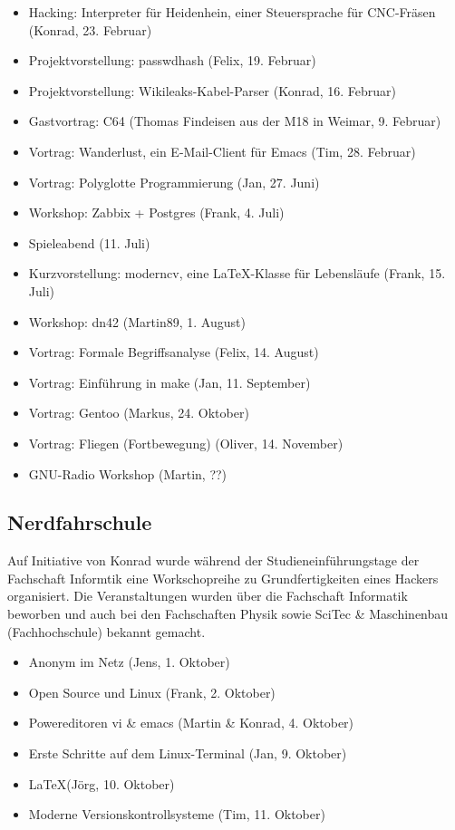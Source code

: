 \documentclass[10pt,DIV16]{scrartcl}
\begin{document}
\begin{itemize}
	\item Hacking:  Interpreter für Heidenhein, einer Steuersprache für CNC-Fräsen (Konrad, 23. Februar)
	\item Projektvorstellung:  passwdhash (Felix, 19. Februar)
	\item Projektvorstellung:  Wikileaks-Kabel-Parser (Konrad, 16. Februar)
	\item Gastvortrag:  C64 (Thomas Findeisen aus der M18 in Weimar, 9. Februar)
	\item Vortrag:  Wanderlust, ein E-Mail-Client für Emacs (Tim, 28. Februar)
	\item Vortrag: Polyglotte Programmierung  (Jan, 27. Juni)
	\item Workshop:  Zabbix + Postgres (Frank, 4. Juli)
	\item Spieleabend (11. Juli)
	\item Kurzvorstellung: moderncv, eine \LaTeX-Klasse für Lebensläufe (Frank, 15. Juli)
	\item Workshop:  dn42 (Martin89, 1. August)
	\item Vortrag:  Formale Begriffsanalyse (Felix, 14. August)
	\item Vortrag:  Einführung in make (Jan, 11. September)
	\item Vortrag:  Gentoo (Markus, 24. Oktober)
	\item Vortrag:  Fliegen (Fortbewegung) (Oliver, 14. November)
	\item GNU-Radio Workshop (Martin, ??)
\end{itemize}

\subsection{Nerdfahrschule}

Auf Initiative von Konrad wurde während der Studieneinführungstage der
Fachschaft Informtik eine Workschopreihe zu Grundfertigkeiten eines Hackers
organisiert.  Die Veranstaltungen wurden über die Fachschaft Informatik
beworben und auch bei den Fachschaften Physik sowie SciTec \& Maschinenbau
(Fachhochschule) bekannt gemacht.

\begin{itemize}
	\item Anonym im Netz (Jens, 1. Oktober)
	\item Open Source und Linux (Frank, 2. Oktober)
	\item Powereditoren vi \& emacs (Martin \& Konrad, 4. Oktober)
	\item Erste Schritte auf dem Linux-Terminal (Jan, 9. Oktober)
	\item \LaTeX (Jörg, 10. Oktober)
	\item Moderne Versionskontrollsysteme (Tim, 11. Oktober)
\end{itemize}
\end{document}
